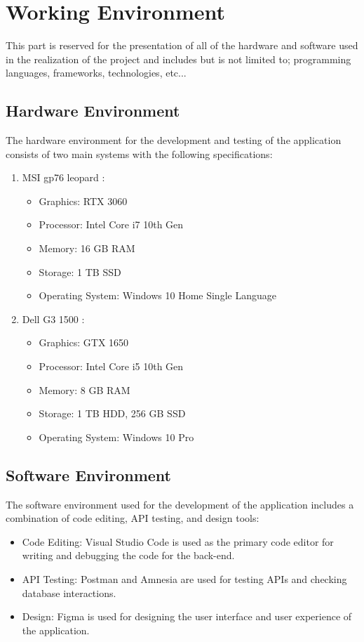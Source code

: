 \section{Working Environment}
This part is reserved for the presentation of all of the hardware and software used in the realization of the project and includes but is not limited to; programming languages, frameworks, technologies, etc...
\subsection{Hardware Environment}
The hardware environment for the development and testing of the application consists of two main systems with the following specifications:

\begin{enumerate}
    \item MSI gp76 leopard :
    \begin{itemize}
        \item Graphics: RTX 3060
        \item Processor: Intel Core i7 10th Gen
        \item Memory: 16 GB RAM
        \item Storage: 1 TB SSD
        \item Operating System: Windows 10 Home Single Language
    \end{itemize}
    \newpage
    \item Dell G3 1500 :
    \begin{itemize}
        \item Graphics: GTX 1650
        \item  Processor: Intel Core i5 10th Gen
        \item Memory: 8 GB RAM
        \item Storage: 1 TB HDD, 256 GB SSD
        \item Operating System: Windows 10 Pro
    \end{itemize}
\end{enumerate}

\subsection{Software Environment}
The software environment used for the development of the application includes a combination of code editing, API testing, and design tools:

\begin{itemize}
    \renewcommand\labelitemi{-}
    \item Code Editing: Visual Studio Code is used as the primary code editor for writing and debugging the code for the back-end.
    \item API Testing: Postman and Amnesia are used for testing APIs and checking database interactions.
    \item Design: Figma is used for designing the user interface and user experience of the application.
\end{itemize}

